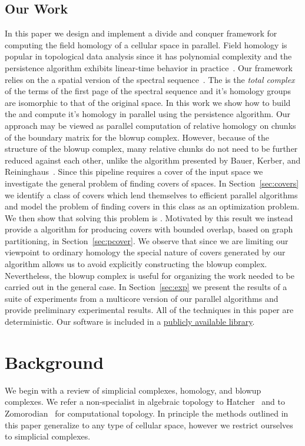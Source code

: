 \documentclass{jocg}
\begin{document}
\subsection{Our Work}
In this paper we design and implement a divide and conquer framework for computing the field 
homology of a cellular space in parallel. Field homology is popular in 
topological data analysis since it has polynomial complexity and the persistence
algorithm exhibits linear-time behavior in practice~\cite{elz-tps-02,zc-cph-05}. 
Our framework relies on the \mvb{} a spatial version of the \mv spectral sequence~\cite{zc-lh-08}. 
The \mvb{} is the \emph{total complex} of the terms of the first page of the 
\mv spectral sequence and it's homology groups are isomorphic to that of the original space. 
In this work we show how to build the \mvb{} and compute it's homology in parallel using the persistence algorithm. Our
approach may be viewed as parallel computation of relative homology on chunks of the boundary matrix for the blowup complex. 
However, because of the structure of the blowup complex, many relative chunks do not need to be further reduced against each other,
unlike the algorithm presented by Bauer, Kerber, and Reininghaus~\cite{bkr-cccph-13}. 
Since this pipeline requires a cover of the input space we investigate the general problem of finding covers of spaces.
In Section~\ref{sec:covers} we identify a class of covers which lend themselves to efficient parallel
algorithms and model the problem of finding covers in this class as an optimization problem. 
We then  show that solving this problem is \NPH{}. Motivated by this result we instead provide a 
algorithm for producing covers with bounded overlap, based on graph partitioning, in Section~\ref{sec:pcover}. We 
observe that since we are limiting our viewpoint to ordinary homology the special nature of covers generated by our algorithm 
allows us to avoid explicitly constructing the blowup complex. Nevertheless, the blowup complex is useful for organizing the
work needed to be carried out in the general case. In Section~\ref{sec:exp} we present the results of a suite of experiments
from a multicore version of our parallel algorithms and provide preliminary experimental results. All of the techniques in this paper are deterministic. 
Our software is included in a \href{https://git.appliedtopology.org}{publicly available library}.

\section{Background}
We begin with a review of simplicial complexes, homology, and blowup complexes.
We refer a non-specialist in algebraic topology to Hatcher~\cite{hatcher}
and to Zomorodian~\cite[Chapter 13]{z-ct-10} for computational topology. 
In principle the methods outlined in this paper generalize to any type of cellular space, 
however we restrict ourselves to simplicial complexes. 
\end{document}
